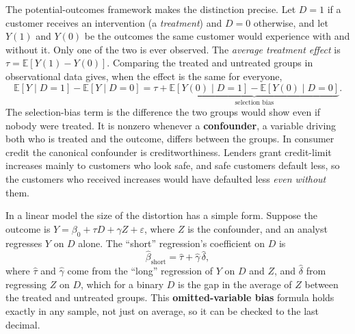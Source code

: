\documentclass[../ai_in_finance]{subfiles}
\begin{document}
The potential-outcomes framework makes the distinction precise. Let $D = 1$ if a customer receives an intervention (a \emph{treatment}) and $D = 0$ otherwise, and let $Y(1)$ and $Y(0)$ be the outcomes the same customer would experience with and without it. Only one of the two is ever observed. The \emph{average treatment effect} is $\tau = \mathbb{E}[Y(1) - Y(0)]$. Comparing the treated and untreated groups in observational data gives, when the effect is the same for everyone,
\begin{equation}
\label{eq:ml-selection-bias}
\mathbb{E}[Y \mid D=1] - \mathbb{E}[Y \mid D=0] = \tau + \underbrace{\mathbb{E}[Y(0) \mid D=1] - \mathbb{E}[Y(0) \mid D=0]}_{\text{selection bias}}.
\end{equation}
The selection-bias term is the difference the two groups would show even if nobody were treated. It is nonzero whenever a \textbf{confounder}, a variable driving both who is treated and the outcome, differs between the groups. In consumer credit the canonical confounder is creditworthiness. Lenders grant credit-limit increases mainly to customers who look safe, and safe customers default less, so the customers who received increases would have defaulted less \emph{even without} them.

In a linear model the size of the distortion has a simple form. Suppose the outcome is $Y = \beta_0 + \tau D + \gamma Z + \varepsilon$, where $Z$ is the confounder, and an analyst regresses $Y$ on $D$ alone. The ``short'' regression's coefficient on $D$ is
\begin{equation}
\label{eq:ml-ovb}
\hat\beta_{\text{short}} = \hat\tau + \hat\gamma\,\hat\delta,
\end{equation}
where $\hat\tau$ and $\hat\gamma$ come from the ``long'' regression of $Y$ on $D$ and $Z$, and $\hat\delta$ from regressing $Z$ on $D$, which for a binary $D$ is the gap in the average of $Z$ between the treated and untreated groups. This \textbf{omitted-variable bias} formula holds exactly in any sample, not just on average, so it can be checked to the last decimal.

\end{document}
